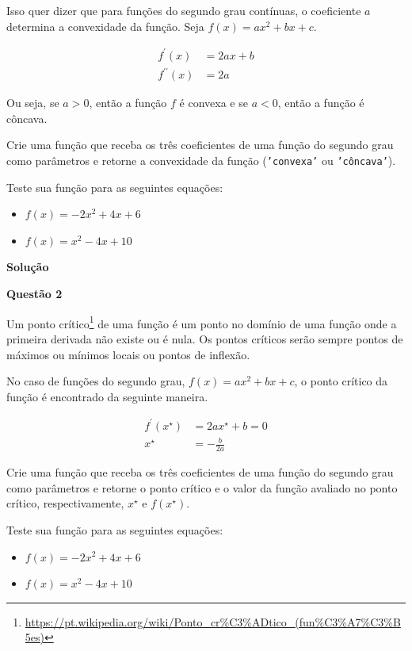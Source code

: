 \documentclass[12pt, a4paper]{article}
\begin{document}
Isso quer dizer que para funções do segundo grau contínuas, o coeficiente $a$ determina a convexidade da função. Seja $f(x) = ax^2 + bx + c$.

\begin{align*}
	f^{\prime} (x) &= 2ax + b \\
	f^{\prime \prime} (x) &= 2a
\end{align*}

Ou seja, se $a > 0$, então a função $f$ é convexa e se $a < 0$, então a função é côncava.

Crie uma função que receba os três coeficientes de uma função do segundo grau como parâmetros e retorne a convexidade da função (\texttt{'convexa'} ou \texttt{'côncava'}).

Teste sua função para as seguintes equações:

\begin{itemize}
	\item $f(x) = -2x^2 + 4x + 6$
	\item $f(x) = x^2 - 4x + 10$
\end{itemize}



\textbf{Solução}





\textbf{Questão 2}

Um ponto crítico\footnote{\url{https://pt.wikipedia.org/wiki/Ponto\_cr\%C3\%ADtico\_(fun\%C3\%A7\%C3\%B5es)}} de uma função é um ponto no domínio de uma função onde a primeira derivada não existe ou é nula. Os pontos críticos serão sempre pontos de máximos ou mínimos locais ou pontos de inflexão.

No caso de funções do segundo grau, $f(x) = ax^2 + bx + c$, o ponto crítico da função é encontrado da seguinte maneira.

\begin{align*}
	f^{\prime} (x^{\star}) &= 2ax^{\star} + b = 0\\
		x^{\star} &= -\frac{b}{2a}
\end{align*}

Crie uma função que receba os três coeficientes de uma função do segundo grau como parâmetros e retorne o ponto crítico e o valor da função avaliado no ponto crítico, respectivamente, $x^{\star}$ e $f (x^{\star})$.

Teste sua função para as seguintes equações:

\begin{itemize}
	\item $f(x) = -2x^2 + 4x + 6$
	\item $f(x) = x^2 - 4x + 10$
\end{itemize}
\end{document}
